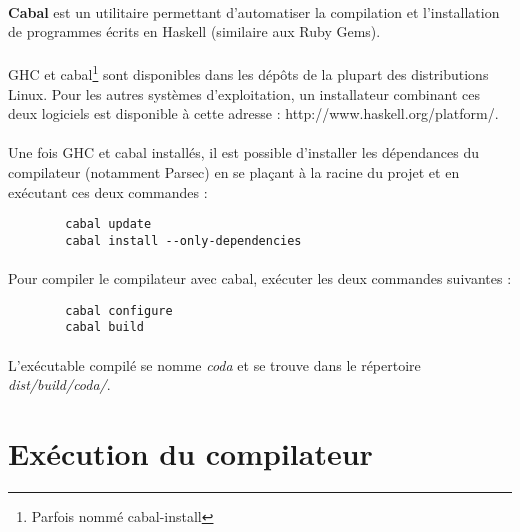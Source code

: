 \documentclass[a4paper]{article}
\begin{document}
    \paragraph{}\textbf{Cabal} est un utilitaire permettant d'automatiser la
compilation et l'installation de programmes écrits en Haskell (similaire aux
Ruby Gems).

    \paragraph{}GHC et cabal\footnote{Parfois nommé cabal-install} sont 
disponibles dans les dépôts de la plupart des distributions Linux. Pour les
autres systèmes d'exploitation, un installateur combinant ces deux logiciels est
disponible à cette adresse : http://www.haskell.org/platform/.

    \paragraph{}Une fois GHC et cabal installés, il est possible d'installer les
dépendances du compilateur (notamment Parsec) en se plaçant à la racine du
projet et en exécutant ces deux commandes :

    \begin{verbatim}
        cabal update
        cabal install --only-dependencies
    \end{verbatim}

    \paragraph{}Pour compiler le compilateur avec cabal, exécuter les deux
commandes suivantes :

    \begin{verbatim}
        cabal configure
        cabal build
    \end{verbatim}

    \paragraph{}L'exécutable compilé se nomme \textit{coda} et se trouve dans le
répertoire \textit{dist/build/coda/}.

\newpage

 \section{Exécution du compilateur}
\end{document}

